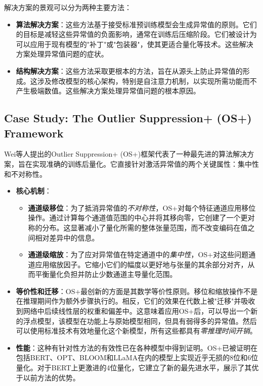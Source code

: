 \documentclass{article}
\begin{document}
解决方案的景观可以分为两种主要方法：
  
  \begin{itemize}
  \item \textbf{算法解决方案}：这些方法基于接受标准预训练模型会生成异常值的原则。它们的目标是减轻这些异常值的负面影响，通常在训练后压缩阶段。它们被设计为可以应用于现有模型的"补丁"或"包装器"，使其更适合量化等技术。这些解决方案处理异常值问题的症状。
  \item \textbf{结构解决方案}：这些方法采取更根本的方法，旨在从源头上防止异常值的形成。这涉及修改模型的核心架构，特别是自注意力机制，以实现所需功能而不产生极端数值。这些解决方案处理异常值问题的根本原因。
  \end{itemize}

\subsection{Case Study: The Outlier Suppression+ (OS+) Framework}

Wei等人\cite{wei2023outlier}提出的Outlier Suppression+ (OS+)框架代表了一种最先进的算法解决方案，旨在实现准确的训练后量化。它直接针对激活异常值的两个关键属性：集中性和不对称性。
  
  \begin{itemize}
  \item \textbf{核心机制}：
    \begin{itemize}
    \item \textbf{通道级移位}：为了抵消异常值的\emph{不对称性}，OS+对每个特征通道应用移位操作。通过计算每个通道值范围的中心并将其移向零，它创建了一个更对称的分布。这显著减小了量化所需的整体张量范围，而不改变编码在值之间相对差异中的信息。
    \item \textbf{通道级缩放}：为了应对异常值在特定通道中的\emph{集中性}，OS+对这些问题通道应用缩放因子。它缩小它们的幅度以更好地与张量的其余部分对齐，从而平衡量化负担并防止少数通道主导量化范围。
    \end{itemize}
  \item \textbf{等价性和迁移}：OS+最创新的方面是其数学等价性原则。移位和缩放操作不是在推理期间作为额外步骤执行的。相反，它们的效果在代数上被"迁移"并吸收到网络中后续线性层的权重和偏差中。这意味着应用OS+后，可以导出一个新的浮点模型，该模型在功能上与原始模型相同，但具有弱得多的异常值。然后可以使用标准技术有效地量化这个新模型，所有这些都具有\emph{零推理时间开销}。
  \item \textbf{性能}：这种有针对性方法的有效性已在各种模型中得到证明。OS+已被证明在包括BERT、OPT、BLOOM和LLaMA在内的模型上实现近乎无损的8位和6位量化。对于BERT上更激进的4位量化，它建立了新的最先进水平，展示了其优于以前方法的优势。
  \end{itemize}
\end{document}
